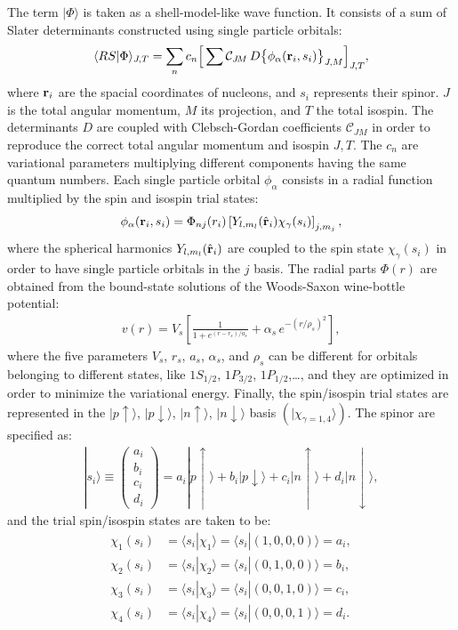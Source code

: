 \documentclass[aps,prc,twocolumn,superscriptaddress,floatfix]{revtex4-1}
\begin{document}
The term $|\Phi\rangle$ is taken as a shell-model-like wave function. 
It consists of a sum of Slater determinants constructed using single particle orbitals:
\begin{align} 
\langle RS|\Phi\rangle_{J,T} = \sum_n c_n\Big[\sum \mathcal C_{J\!M}\,D\big\{\phi_\alpha(\vb{r}_i,s_i)\big\}_{J,M}\Big]_{J,T} ,
\end{align}
where $\vb{r}_i$ are the spacial coordinates of nucleons, and $s_i$ represents their spinor.
$J$ is the total angular momentum, $M$ its projection, and $T$ the total isospin.
The determinants $D$ are coupled with Clebsch-Gordan coefficients $\mathcal C_{J\!M}$ in order to reproduce the correct 
total angular momentum and isospin $J,T$. The $c_n$ are variational parameters multiplying different 
components having the same quantum numbers. 
Each single particle orbital $\phi_\alpha$ consists in a radial function multiplied by the spin and
isospin trial states:
\begin{align}
\phi_\alpha(\vb{r}_i,s_i)=\Phi_{nj}(r_i)\left[Y_{l,m_l}(\hat{\vb{r}}_i)\chi_\gamma(s_i)\right]_{j,m_j} ,
\label{eq:phi}
\end{align}
where the spherical harmonics $Y_{l,m_l}(\hat{\vb{r}}_i)$ are coupled to the spin state $\chi_\gamma(s_i)$
in order to have single particle orbitals in the $j$ basis.
The radial parts $\Phi(r)$ are obtained from the bound-state solutions of the Woods-Saxon 
wine-bottle potential:
\begin{align}
v(r)=V_s\left[\frac{1}{1+e^{(r-r_s)/a_s}}+\alpha_s\,e^{-(r/{\rho_s})^2}\right] ,
\end{align}
where the five parameters $V_s$, $r_s$, $a_s$, $\alpha_s$, and $\rho_s$ can be different for orbitals
belonging to different states, like $1S_{1/2}$, $1P_{3/2}$, $1P_{1/2}$,\ldots, and they are 
optimized in order to minimize the variational energy.
Finally, the spin/isospin trial states are represented in the $|p\uparrow\rangle$, $|p\downarrow\rangle$,
$|n\uparrow\rangle$, $|n\downarrow\rangle$ basis $(|\chi_{\gamma=1,4}\rangle)$. 
The spinor are specified as:
\begin{align}
|s_i\rangle \equiv \left(\begin{array}{c} 
a_i \\ b_i \\ c_i \\ d_i
\end{array}\right)
=a_i|p\uparrow\rangle+b_i|p\downarrow\rangle+c_i|n\uparrow\rangle+d_i|n\downarrow\rangle ,
\end{align}
and the trial spin/isospin states are taken to be:
\begin{align}
\chi_1(s_i)&=\langle s_i|\chi_1\rangle=\langle s_i|(1,0,0,0)\rangle=a_i,\nonumber \\
\chi_2(s_i)&=\langle s_i|\chi_2\rangle=\langle s_i|(0,1,0,0)\rangle=b_i,\nonumber \\
\chi_3(s_i)&=\langle s_i|\chi_3\rangle=\langle s_i|(0,0,1,0)\rangle=c_i,\nonumber \\
\chi_4(s_i)&=\langle s_i|\chi_4\rangle=\langle s_i|(0,0,0,1)\rangle=d_i .
\end{align}
\end{document}
